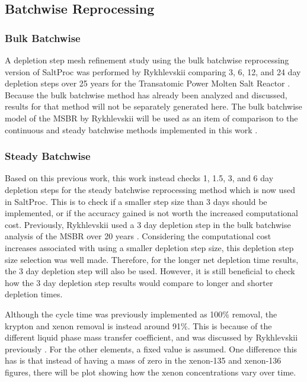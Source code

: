 \subsection{Batchwise Reprocessing}

\subsubsection{Bulk Batchwise}

A depletion step mesh refinement study using the bulk batchwise reprocessing version of SaltProc was performed by Rykhlevskii comparing 3, 6, 12, and 24 day depletion steps over 25 years for the Transatomic Power Molten Salt Reactor \cite{rykhlevskii_fuel_2020}. Because the bulk batchwise method has already been analyzed and discussed, results for that method will not be separately generated here. The bulk batchwise model of the MSBR by Rykhlevskii will be used as an item of comparison to the continuous and steady batchwise methods implemented in this work \cite{rykhlevskii_advanced_2018}.

\subsubsection{Steady Batchwise}

Based on this previous work, this work instead checks 1, 1.5, 3, and 6 day depletion steps for the steady batchwise reprocessing method which is now used in SaltProc. This is to check if a smaller step size than 3 days should be implemented, or if the accuracy gained is not worth the increased computational cost. Previously, Rykhlevskii used a 3 day depletion step in the bulk batchwise analysis of the MSBR over 20 years \cite{rykhlevskii_advanced_2018}. Considering the computational cost increases associated with using a smaller depletion step size, this depletion step size selection was well made. Therefore, for the longer net depletion time results, the 3 day depletion step will also be used. However, it is still beneficial to check how the 3 day depletion step results would compare to longer and shorter depletion times.

Although the cycle time was previously implemented as 100\% removal, the krypton and xenon removal is instead around 91\%. This is because of the different liquid phase mass transfer coefficient, and was discussed by Rykhlevskii previously \cite{rykhlevskii_fuel_2020}. For the other elements, a fixed value is assumed. One difference this has is that instead of having a mass of zero in the xenon-135 and xenon-136 figures, there will be plot showing how the xenon concentrations vary over time.

